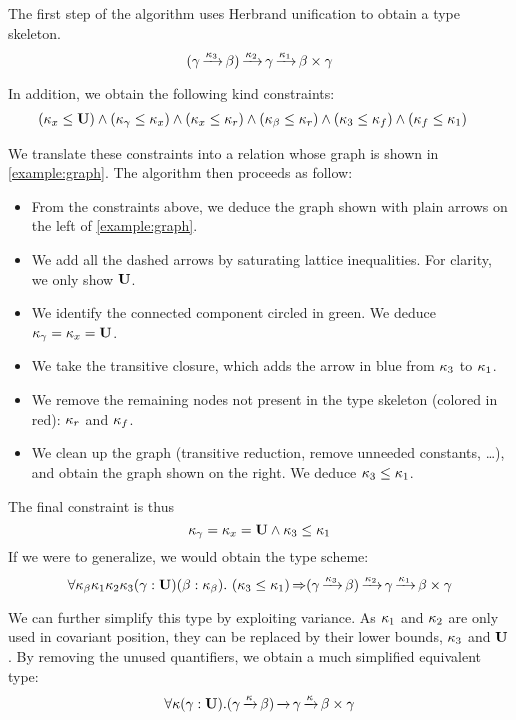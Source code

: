 The first step of the algorithm uses Herbrand unification to obtain
a type skeleton. 
$$
(\gamma \operatorname{\xrightarrow{\kappa_3}} \beta) \operatorname{\xrightarrow{\kappa_2}} \gamma \operatorname{\xrightarrow{\kappa_1}} \beta \times  \gamma$$

In addition, we obtain the following kind constraints: 
\[\begin{aligned}
    &(\kappa_x \leq \mathbf{U})
    \wedge
    (\kappa_\gamma \leq \kappa_x)
    \wedge
    (\kappa_x \leq \kappa_r)
    \wedge
    (\kappa_\beta \leq \kappa_r)
    \wedge
    (\kappa_3 \leq \kappa_f)
    \wedge
    (\kappa_f \leq \kappa_1)
\end{aligned}\]

We translate these constraints into a relation whose graph
is shown in \cref{example:graph}.
%
The algorithm then proceeds as follow:
\begin{itemize}[noitemsep]
\item From the constraints above, we deduce the graph shown
  with plain arrows on the left of \cref{example:graph}.
\item We add all the dashed arrows by saturating
  lattice inequalities. For clarity, we only show $\mathbf{U}$.
\item We identify the connected component circled in
  {\color{ForestGreen} green}.
  We deduce $\kappa_\gamma = \kappa_x = \mathbf{U}$.
\item We take the transitive closure, which adds the
  arrow in {\color{blue} blue} from $\kappa_3$ to $\kappa_1$.
\item We remove the remaining nodes not present in the type skeleton (colored in {\color{red} red}): $\kappa_r$ and $\kappa_f$.
\item We clean up the graph (transitive reduction, remove unneeded constants, \dots),
  and obtain the graph shown on the right.
  We deduce $\kappa_3 \leq \kappa_1$.
\end{itemize}

The final constraint is thus
$$\kappa_\gamma = \kappa_x = \mathbf{U} \wedge \kappa_3 \leq \kappa_1$$
If we were to generalize, we would obtain the type scheme:
$$\forall \kvar_\beta \kvar_1 \kvar_2 \kvar_3
(\gamma : \kun) (\beta : \kvar_\beta).\ %
\qual
{\Cleq{\kvar_3}{\kvar_1}}
{(\gamma \tarr{\kvar_3} \beta) \tarr{\kvar_2} \gamma \tarr{\kvar_1} \beta \times  \gamma}$$

We can further simplify this type by exploiting variance. As $\kappa_1$
and $\kappa_2$ are only used in covariant position, they can be
replaced by their lower bounds, $\kappa_3$ and $\mathbf{U}$. 
By removing the unused quantifiers, we obtain a much simplified equivalent type:
$$
\forall \kappa
(\gamma : \mathbf{U}).
{(\gamma \operatorname{\xrightarrow{\kappa}} \beta) \operatorname{\xrightarrow{}} \gamma \operatorname{\xrightarrow{\kappa}} \beta \times  \gamma}$$



